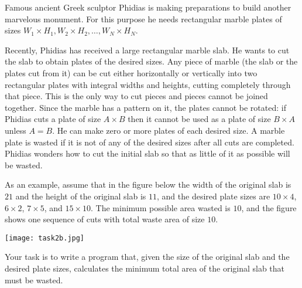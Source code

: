 Famous ancient Greek sculptor Phidias is making preparations to build another marvelous monument.
For this purpose he needs rectangular marble plates of sizes $W_1\times H_1, W_2 \times H_2, \ldots, W_N \times H_N$.

Recently, Phidias has received a large rectangular marble slab.
He wants to cut the slab to obtain plates of the desired sizes.
Any piece of marble (the slab or the plates cut from it) can be cut either horizontally or vertically into two rectangular plates with integral widths and heights, cutting completely through that piece.
This is the only way to cut pieces and pieces cannot be joined together.
Since the marble has a pattern on it, the plates cannot be rotated: if Phidias cuts a plate of size $A \times B$ then it cannot be used as a plate of size $B \times A$ unless $A = B$.
He can make zero or more plates of each desired size.
A marble plate is wasted if it is not of any of the desired sizes after all cuts are completed.
Phidias wonders how to cut the initial slab so that as little of it as possible will be wasted.

As an example, assume that in the figure below the width of the original slab is $21$ and the height of the original slab is $11$, and the desired plate sizes are $10 \times 4$, $6 \times 2$, $7 \times 5$, and $15 \times 10$.
The minimum possible area wasted is $10$, and the figure shows one sequence of cuts with total waste area of size $10$.

\texttt{[image: task2b.jpg]}


Your task is to write a program that, given the size of the original slab and the desired plate sizes, calculates the minimum total area of the original slab that must be wasted.
